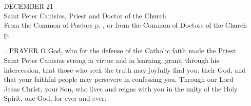 \begin{center}\normalsize DECEMBER 21\\
\footnotesize Saint Peter Canisius, Priest and Doctor of the Church\\
\footnotesize From the Common of Pastors p.  , or from the Common of Doctors of the Church p.\\
\end{center}

\hangindent=\parindent \small{PRAYER 
O God, who for the defense of the Catholic faith
made the Priest Saint Peter Canisius
strong in virtue and in learning,
grant, through his intercession,
that those who seek the truth
may joyfully find you, their God,
and that your faithful people
may persevere in confessing you.
Through our Lord Jesus Christ, your Son,
who lives and reigns with you in the unity of the Holy Spirit,
one God, for ever and ever.\\}
 

